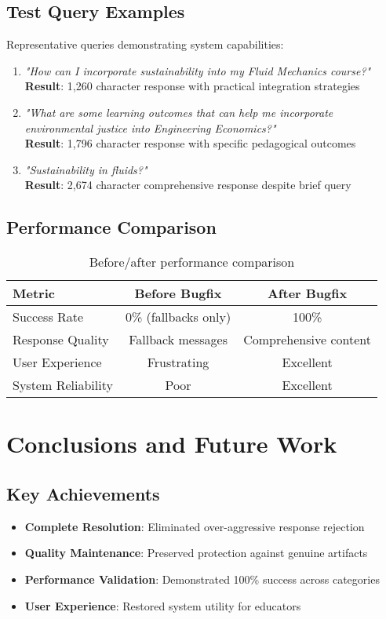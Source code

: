 \documentclass[12pt,a4paper]{article}
\begin{document}
\subsection{Test Query Examples}
Representative queries demonstrating system capabilities:

\begin{enumerate}
    \item \textit{"How can I incorporate sustainability into my Fluid Mechanics course?"} \\
    \textbf{Result}: 1,260 character response with practical integration strategies
    
    \item \textit{"What are some learning outcomes that can help me incorporate environmental justice into Engineering Economics?"} \\
    \textbf{Result}: 1,796 character response with specific pedagogical outcomes
    
    \item \textit{"Sustainability in fluids?"} \\
    \textbf{Result}: 2,674 character comprehensive response despite brief query
\end{enumerate}

\subsection{Performance Comparison}
\begin{table}[H]
\centering
\begin{tabular}{@{}lcc@{}}
\toprule
\textbf{Metric} & \textbf{Before Bugfix} & \textbf{After Bugfix} \\
\midrule
Success Rate & 0\% (fallbacks only) & 100\% \\
Response Quality & Fallback messages & Comprehensive content \\
User Experience & Frustrating & Excellent \\
System Reliability & Poor & Excellent \\
\bottomrule
\end{tabular}
\caption{Before/after performance comparison}
\end{table}

\section{Conclusions and Future Work}

\subsection{Key Achievements}
\begin{itemize}
    \item \textbf{Complete Resolution}: Eliminated over-aggressive response rejection
    \item \textbf{Quality Maintenance}: Preserved protection against genuine artifacts
    \item \textbf{Performance Validation}: Demonstrated 100\% success across categories
    \item \textbf{User Experience}: Restored system utility for educators
\end{itemize}
\end{document}

